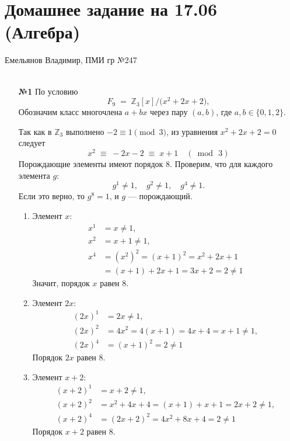 \documentclass[a4paper]{article}
\newcommand{\ZZ}{\mathbb{Z}}
\begin{document}
\section*{Домашнее задание на 17.06 (Алгебра)}
 {\large Емельянов Владимир, ПМИ гр №247}\\\\
\begin{enumerate}
  \item[\textbf{№1}]
  По условию
  \[
    F_9 \; = \; \ZZ_3[x]\big/\bigl(x^2 + 2x + 2\bigr),
  \]
  Обозначим класс многочлена \(a + b x\) через пару \((a,b)\), где \(a,b\in\{0,1,2\}\).

  
  Так как в \(\ZZ_3\) выполнено \(-2 \equiv 1\pmod{3}\), 
  из уравнения \(x^2 + 2x + 2 = 0\) следует
  \[
    x^2 \;\equiv\; -2x - 2 \;\equiv\; x + 1 \quad(\bmod\,3)
  \]
  Порождающие элементы имеют порядок 8. Проверим, что для каждого элемента $g$:
  $$
  g^1 \neq 1, \quad g^2 \neq 1, \quad g^4 \neq 1.
  $$
  Если это верно, то $g^8 = 1$, и $g$ — порождающий.
    
  \begin{enumerate}
    \item Элемент $x$:
      $$
      \begin{aligned}
      x^1 &= x \neq 1, \\
      x^2 &= x + 1 \neq 1, \\
      x^4 &= (x^2)^2 = (x + 1)^2 = x^2 + 2x + 1 \\ & = (x + 1) + 2x + 1 = 3x + 2 =
       2 \neq 1
      \end{aligned}
      $$
      Значит, порядок $x$ равен 8.

    \item Элемент $2x$:
      $$
      \begin{aligned}
      (2x)^1 &= 2x \neq 1, \\
      (2x)^2 &= 4x^2 = 4(x + 1) = 4x + 4 = x + 1 \neq 1, \\
      (2x)^4 &= (x + 1)^2 = 2 \neq 1
      \end{aligned}
      $$
      Порядок $2x$ равен 8.

    \item Элемент $x + 2$:
      $$
      \begin{aligned}
      (x + 2)^1 &= x + 2 \neq 1, \\
      (x + 2)^2 &= x^2 + 4x + 4 = (x + 1) + x + 1 = 2x + 2 \neq 1, \\
      (x + 2)^4 &= (2x + 2)^2 = 4x^2 + 8x + 4 = 2 \neq 1
      \end{aligned}
      $$
      Порядок $x + 2$ равен 8.


\end{enumerate}
\end{enumerate}
\end{document}
